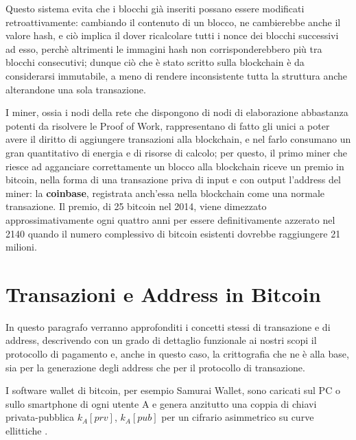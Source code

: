 Questo sistema evita che i blocchi già inseriti possano essere modificati retroattivamente: cambiando il contenuto di un blocco, ne cambierebbe anche il valore hash, e ciò implica il dover ricalcolare tutti i nonce dei blocchi successivi ad esso, perchè altrimenti le immagini hash non corrisponderebbero più tra blocchi consecutivi; dunque ciò che è stato scritto sulla blockchain è da considerarsi immutabile, a meno di rendere inconsistente tutta la struttura anche alterandone una sola transazione.

I miner, ossia i nodi della rete che dispongono di nodi di elaborazione abbastanza potenti da risolvere le Proof of Work, rappresentano di fatto gli unici a poter avere il diritto di aggiungere transazioni alla blockchain, e nel farlo consumano un gran quantitativo di energia e di risorse di calcolo; per questo, il primo miner che riesce ad agganciare correttamente un blocco alla blockchain riceve un premio in bitcoin, nella forma di una transazione priva di input e con output l’address del miner: la \textbf{coinbase}, registrata anch’essa nella blockchain come una normale transazione. Il premio, di 25 bitcoin nel 2014, viene dimezzato approssimativamente ogni quattro anni per essere deﬁnitivamente azzerato nel 2140 quando il numero complessivo di bitcoin esistenti dovrebbe raggiungere 21 milioni.
\section{Transazioni e Address in Bitcoin}\label{Transazioni}
In questo  paragrafo verranno approfonditi i concetti stessi di transazione e di address, descrivendo con un grado di dettaglio funzionale ai nostri scopi il protocollo di pagamento e, anche in questo caso, la crittografia che ne è alla base, sia per la generazione degli address che per il protocollo di transazione.

I software wallet di bitcoin, per esempio Samurai Wallet, sono caricati sul PC o sullo smartphone di ogni utente A e genera anzitutto una coppia di chiavi privata-pubblica $k_A [prv]$, $k_A [pub]$ per un cifrario asimmetrico su curve ellittiche \cite{curve}.

